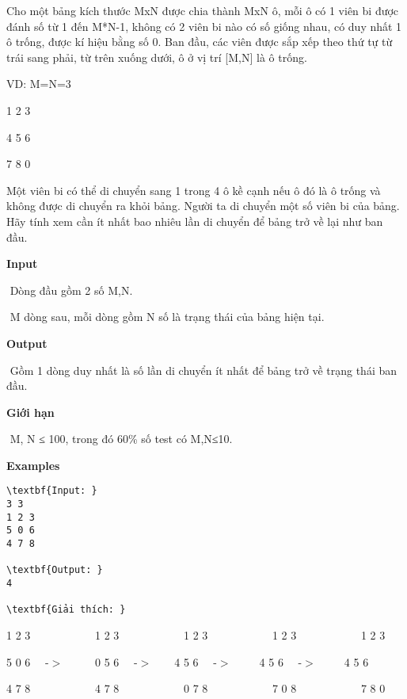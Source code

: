 

Cho một bảng kích thước MxN được chia thành MxN ô, mỗi ô có 1 viên bi được đánh số từ 1 đến M*N-1, không có 2 viên bi nào có số giống nhau, có duy nhất 1 ô trống, được kí hiệu bằng số 0. Ban đầu, các viên được sắp xếp theo thứ tự từ trái sang phải, từ trên xuống dưới, ô ở vị trí [M,N] là ô trống.

VD: M=N=3

1 2 3

4 5 6

7 8 0

Một viên bi có thể di chuyển sang 1 trong 4 ô kề cạnh nếu ô đó là ô trống và không được di chuyển ra khỏi bảng. Người ta di chuyển một số viên bi của bảng. Hãy tính xem cần ít nhất bao nhiêu lần di chuyển để bảng trở về lại như ban đầu.

\textbf{Input}

 Dòng đầu gồm 2 số M,N.

 M dòng sau, mỗi dòng gồm N số là trạng thái của bảng hiện tại.

\textbf{Output}

 Gồm 1 dòng duy nhất là số lần di chuyển ít nhất để bảng trở về trạng thái ban đầu.

\textbf{Giới hạn}

 M, N ≤ 100, trong đó 60\% số test có M,N≤10.

\textbf{Examples}
\begin{verbatim}
\textbf{Input: }
3 3
1 2 3
5 0 6
4 7 8

\textbf{Output: }
4

\textbf{Giải thích: }\end{verbatim}

1 2 3            1 2 3            1 2 3            1 2 3            1 2 3

5 0 6   -$>$      0 5 6   -$>$     4 5 6   -$>$      4 5 6   -$>$      4 5 6

4 7 8            4 7 8            0 7 8            7 0 8            7 8 0